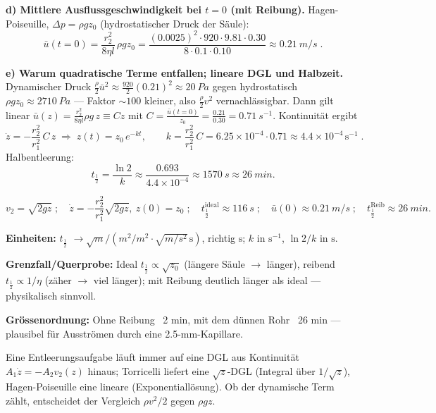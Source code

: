 \textbf{d) Mittlere Ausflussgeschwindigkeit bei $t=0$ (mit Reibung).}
Hagen-Poiseuille, $\Delta p=\rho g z_0$ (hydrostatischer Druck der Säule):
\begin{equation}
  \bar u(t{=}0)=\frac{r_2^2}{8\eta l}\,\rho g z_0
  =\frac{(0.0025)^2\cdot 920\cdot 9.81\cdot 0.30}
        {8\cdot 0.1\cdot 0.10}
  \approx \qty{0.21}{m/s}\;.
\end{equation}

\textbf{e) Warum quadratische Terme entfallen; lineare DGL und Halbzeit.}
Dynamischer Druck $\tfrac\rho2 \bar u^2\approx \tfrac{920}{2}(0.21)^2
\approx\qty{20}{Pa}$ gegen hydrostatisch $\rho g z_0\approx\qty{2710}{Pa}$ ---
Faktor $\sim100$ kleiner, also $\tfrac\rho2 v^2$ vernachlässigbar. Dann gilt
linear $\bar u(z)=\frac{r_2^2}{8\eta l}\rho g\, z\equiv C z$ mit
$C=\frac{\bar u(t{=}0)}{z_0}=\frac{0.21}{0.30}=\qty{0.71}{s^{-1}}$.
Kontinuität ergibt
\begin{equation}
  \dot z=-\frac{r_2^2}{r_1^2}\,C\,z
  \;\Rightarrow\;
  z(t)=z_0\,e^{-k t},\qquad
  k=\frac{r_2^2}{r_1^2}\,C=6.25\times10^{-4}\cdot 0.71
    \approx 4.4\times10^{-4}\,\mathrm{s^{-1}}\;.
\end{equation}
Halbentleerung:
\begin{equation*}
  t_{\tfrac12}=\frac{\ln 2}{k}\approx\frac{0.693}{4.4\times10^{-4}}
  \approx \qty{1570}{s}\approx\qty{26}{min}.
\end{equation*}

\begin{ergebnis}
\begin{equation*}
  v_2=\sqrt{2gz}\;;\quad
  \dot z=-\frac{r_2^2}{r_1^2}\sqrt{2gz},\ z(0)=z_0\;;\quad
  t_{\tfrac12}^{\mathrm{ideal}}\approx\qty{116}{s}\;;\quad
  \bar u(0)\approx\qty{0.21}{m/s}\;;\quad
  t_{\tfrac12}^{\mathrm{Reib}}\approx\qty{26}{min}.
\end{equation*}
\end{ergebnis}

\begin{kontrolle}
\textbf{Einheiten:} $t_{\tfrac12}$
$\to\sqrt{m}/(m^2/m^2\cdot \sqrt{m/s^2}\,\mathrm{s})$, richtig $\mathrm{s}$;
$k$ in $\mathrm{s^{-1}}$, $\ln2/k$ in $\mathrm{s}$. \checkmark

\textbf{Grenzfall/Querprobe:} Ideal $t_{\tfrac12}\propto\sqrt{z_0}$ (längere
Säule $\to$ länger), reibend $t_{\tfrac12}\propto 1/\eta$ (zäher $\to$ viel länger);
mit Reibung deutlich länger als ideal --- physikalisch sinnvoll.

\textbf{Grössenordnung:} Ohne Reibung ~2 min, mit dem dünnen Rohr ~26 min ---
plausibel für Ausströmen durch eine 2.5-mm-Kapillare.
\end{kontrolle}

\begin{merksatz}
Eine Entleerungsaufgabe läuft immer auf eine DGL aus Kontinuität
$A_1\dot z=-A_2 v_2(z)$ hinaus; Torricelli liefert eine $\sqrt z$-DGL
(Integral über $1/\sqrt z$), Hagen-Poiseuille eine lineare (Exponentiallösung).
Ob der dynamische Term zählt, entscheidet der Vergleich
$\rho v^2/2$ gegen $\rho g z$.
\end{merksatz}
